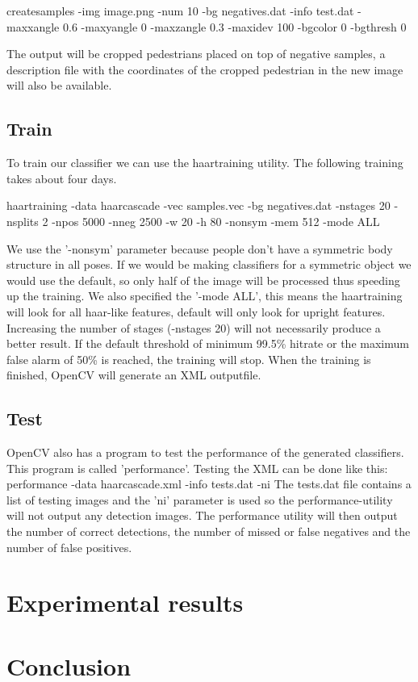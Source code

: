\documentclass{article}
\begin{document}
createsamples -img image.png -num 10 -bg negatives.dat -info test.dat -maxxangle 0.6 -maxyangle 0 -maxzangle 0.3 -maxidev 100 -bgcolor 0 -bgthresh 0

The output will be cropped pedestrians placed on top of negative samples, a description file with the coordinates of the cropped pedestrian in the new image will also be available.




\subsection{Train}
To train our classifier we can use the haartraining utility. The following training takes about four days.

haartraining -data haarcascade -vec samples.vec -bg negatives.dat -nstages 20 -nsplits 2 -npos 5000 -nneg 2500 -w 20 -h 80 -nonsym -mem 512 -mode ALL

We use the '-nonsym' parameter because people don't have a symmetric body structure in all poses. If we would be making classifiers for a symmetric object we would use the default, so only half of the image will be processed  thus speeding up the training. We also specified the '-mode ALL', this means the haartraining will look for all haar-like features, default will only look for upright features.
Increasing the number of stages (-nstages 20) will not necessarily produce a better result. If the default threshold of minimum 99.5\% hitrate or the maximum false alarm of 50\% is reached, the training will stop.
When the training is finished, OpenCV will generate an XML outputfile.
\subsection{Test}
OpenCV also has a program to test the performance of the generated classifiers. This program is called 'performance'. Testing the XML can be done like this:
performance -data haarcascade.xml -info tests.dat -ni
The tests.dat file contains a list of testing images and the 'ni' parameter is used so the performance-utility will not output any detection images.
The performance utility will then output the number of correct detections, the number of missed or false negatives and the number of false positives.
\section{Experimental results}

\section{Conclusion}
\end{document}
